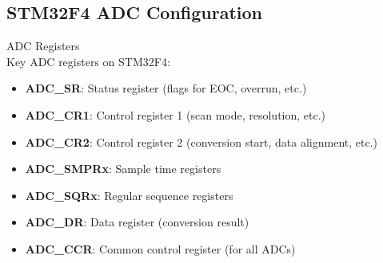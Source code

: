\subsection{STM32F4 ADC Configuration}

\begin{definition}{ADC Registers}\\
Key ADC registers on STM32F4:
\begin{itemize}
    \item \textbf{ADC\_SR}: Status register (flags for EOC, overrun, etc.)
    \item \textbf{ADC\_CR1}: Control register 1 (scan mode, resolution, etc.)
    \item \textbf{ADC\_CR2}: Control register 2 (conversion start, data alignment, etc.)
    \item \textbf{ADC\_SMPRx}: Sample time registers
    \item \textbf{ADC\_SQRx}: Regular sequence registers
    \item \textbf{ADC\_DR}: Data register (conversion result)
    \item \textbf{ADC\_CCR}: Common control register (for all ADCs)
\end{itemize}
\end{definition}

